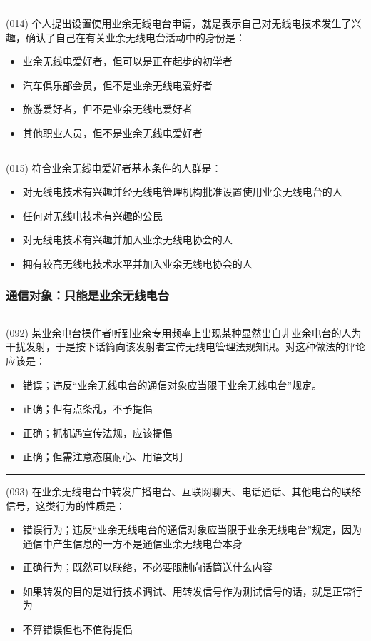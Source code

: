\documentclass[twocolumn,hyperref,UTF8]{ctexart}  %
\begin{document}
\noindent\rule{0.5\textwidth}{1pt}
\heiti (014) 个人提出设置使用业余无线电台申请，就是表示自己对无线电技术发生了兴趣，确认了自己在有关业余无线电台活动中的身份是： \songti {\color{gray} [LK0052] }
\begin{itemize}
	\item  业余无线电爱好者，但可以是正在起步的初学者
	\item  汽车俱乐部会员，但{\color{red}不是}业余无线电爱好者
	\item  旅游爱好者，但{\color{red}不是}业余无线电爱好者
	\item  其他职业人员，但{\color{red}不是}业余无线电爱好者
\end{itemize}


\noindent\rule{0.5\textwidth}{1pt}
\heiti (015) 符合业余无线电爱好者基本条件的人群是： \songti {\color{gray} [LK0112] }
\begin{itemize}
	\item  对无线电技术有兴趣并{\color{LimeGreen}经无线电管理机构批准}设置使用业余无线电台的人
	\item  {\color{red}任何}对无线电技术有兴趣的公民
	\item  对无线电技术有兴趣并加入业余无线电协会的人
	\item  拥有{\color{red}较高}无线电技术水平并加入业余无线电协会的人
\end{itemize}


\vspace{12pt}
\subsubsection{通信对象：只能是业余无线电台}


\noindent\rule{0.5\textwidth}{1pt}
\heiti (092) 某业余电台操作者听到业余专用频率上出现某种显然出自{\color{cyan}非业余电台}的人为干扰发射，于是按下话筒向该发射者宣传无线电管理法规知识。对这种做法的评论应该是： \songti {\color{gray} [LK0056] }
\begin{itemize}
	\item  错误；违反“业余无线电台的通信对象应当限于业余无线电台”规定。
	\item  正确；但有点条乱，不予提倡
	\item  正确；抓机遇宣传法规，应该提倡
	\item  正确；但需注意态度耐心、用语文明
\end{itemize}


\noindent\rule{0.5\textwidth}{1pt}
\heiti (093) 在业余无线电台中转发广播电台、互联网聊天、电话通话、其他电台的联络信号，这类行为的性质是： \songti {\color{gray} [LK0057] }
\begin{itemize}
	\item  错误行为；违反“业余无线电台的通信对象应当限于业余无线电台”规定，因为通信中产生信息的一方不是通信业余无线电台本身
	\item  正确行为；既然可以联络，不必要限制向话筒送什么内容
	\item  如果转发的目的是进行技术调试、用转发信号作为测试信号的话，就是正常行为
	\item  不算错误但也不值得提倡
\end{itemize}
\end{document}
